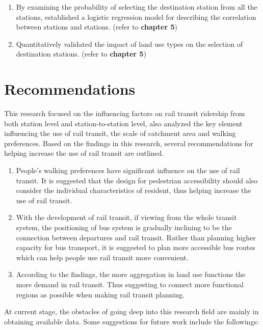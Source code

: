 \begin{enumerate}
	\item By examining the probability of selecting the destination station from all the stations, established a logistic regression model for describing the correlation between stations and stations. (refer to \textbf{chapter 5})
	
	\item Quantitatively validated the impact of land use types on the selection of destination stations. (refer to \textbf{chapter 5})
	
\end{enumerate} 

\section{Recommendations}
This research focused on the influencing factors on rail transit ridership from both station level and station-to-station level, also analyzed the key element influencing the use of rail transit, the scale of catchment area and walking preferences. Based on the findings in this research, several recommendations for helping increase the use of rail transit are outlined.

%
\begin{enumerate}
	\item People's walking preferences have significant influence on the use of rail transit. It is suggested that the design for pedestrian accessibility should also consider the individual characteristics of resident, thus helping increase the use of rail transit.
	
	\item With the development of rail transit, if viewing from the whole transit system, the positioning of bus system is gradually inclining to be the connection between departures and rail transit. Rather than planning higher capacity for bus transport, it is suggested to plan more accessible bus routes which can help people use rail transit more convenient.
	
	\item According to the findings, the more aggregation in land use functions the more demand in rail transit. Thus suggesting to connect more functional regions as possible when making rail transit planning.
\end{enumerate}

At current stage, the obstacles of going deep into this research field are mainly in obtaining available data. Some suggestions for future work include the followings:

